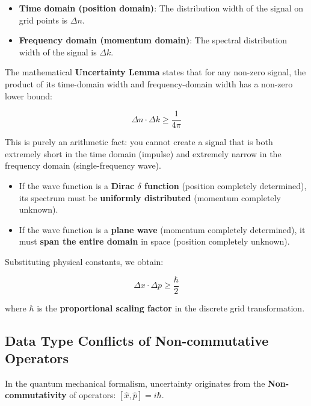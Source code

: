\begin{itemize}
\item \textbf{Time domain (position domain)}: The distribution width of the signal on grid points is $\Delta n$.

\item \textbf{Frequency domain (momentum domain)}: The spectral distribution width of the signal is $\Delta k$.
\end{itemize}

The mathematical \textbf{Uncertainty Lemma} states that for any non-zero signal, the product of its time-domain width and frequency-domain width has a non-zero lower bound:

\begin{equation}
\Delta n \cdot \Delta k \ge \frac{1}{4\pi}
\end{equation}

This is purely an arithmetic fact: you cannot create a signal that is both extremely short in the time domain (impulse) and extremely narrow in the frequency domain (single-frequency wave).

\begin{itemize}
\item If the wave function is a \textbf{Dirac $\delta$ function} (position completely determined), its spectrum must be \textbf{uniformly distributed} (momentum completely unknown).

\item If the wave function is a \textbf{plane wave} (momentum completely determined), it must \textbf{span the entire domain} in space (position completely unknown).
\end{itemize}

Substituting physical constants, we obtain:

\begin{equation}
\Delta x \cdot \Delta p \ge \frac{\hbar}{2}
\end{equation}

where $\hbar$ is the \textbf{proportional scaling factor} in the discrete grid transformation.

\subsection{Data Type Conflicts of Non-commutative Operators}

In the quantum mechanical formalism, uncertainty originates from the \textbf{Non-commutativity} of operators: $[\hat{x}, \hat{p}] = i\hbar$.


